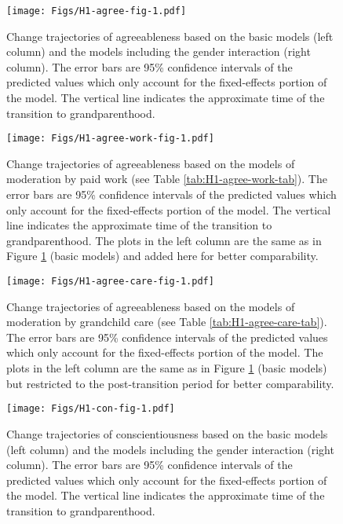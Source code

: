 \documentclass[
  english,
  man, noextraspace]{apa7}
\begin{document}
\begin{appendix}
\begin{figure}
\centering
\texttt{[image: Figs/H1-agree-fig-1.pdf]}
\caption{\label{fig:H1-agree-fig}Change trajectories of agreeableness based on the
basic models (left column) and the models including the gender
interaction (right column). The error bars are 95\% confidence intervals
of the predicted values which only account for the fixed-effects portion
of the model. The vertical line indicates the approximate time of the
transition to grandparenthood.}
\end{figure}










\begin{figure}
\centering
\texttt{[image: Figs/H1-agree-work-fig-1.pdf]}
\caption{\label{fig:H1-agree-work-fig}Change trajectories of agreeableness based
on the models of moderation by paid work (see Table
\ref{tab:H1-agree-work-tab}). The error bars are 95\% confidence
intervals of the predicted values which only account for the
fixed-effects portion of the model. The vertical line indicates the
approximate time of the transition to grandparenthood. The plots in the
left column are the same as in Figure \ref{fig:H1-agree-fig} (basic
models) and added here for better comparability.}
\end{figure}









\begin{figure}
\centering
\texttt{[image: Figs/H1-agree-care-fig-1.pdf]}
\caption{\label{fig:H1-agree-care-fig}Change trajectories of agreeableness based
on the models of moderation by grandchild care (see Table
\ref{tab:H1-agree-care-tab}). The error bars are 95\% confidence
intervals of the predicted values which only account for the
fixed-effects portion of the model. The plots in the left column are the
same as in Figure \ref{fig:H1-agree-fig} (basic models) but restricted
to the post-transition period for better comparability.}
\end{figure}








\begin{figure}
\centering
\texttt{[image: Figs/H1-con-fig-1.pdf]}
\caption{\label{fig:H1-con-fig}Change trajectories of conscientiousness based on
the basic models (left column) and the models including the gender
interaction (right column). The error bars are 95\% confidence intervals
of the predicted values which only account for the fixed-effects portion
of the model. The vertical line indicates the approximate time of the
transition to grandparenthood.}
\end{figure}











\end{appendix}
\end{document}
